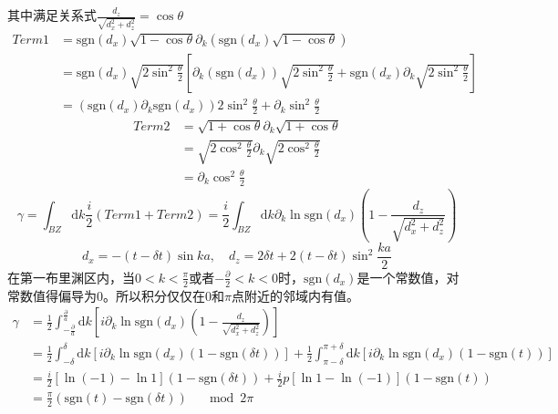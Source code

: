 \documentclass{article}
\numberwithin{equation}{subsection}
\newcommand{\md}{\mathrm{d}}
\newcommand{\sgn}{\mathrm{sgn}}
\begin{document}
其中满足关系式$\frac{d_z}{\sqrt{d_x^2+d_z^2}}=\cos\theta$
\begin{equation}
    \begin{split}
        Term1&=\sgn(d_x)\sqrt{1-\cos\theta}\partial_k(\sgn(d_x)\sqrt{1-\cos\theta})\\
        &=\sgn(d_x)\sqrt{2\sin^2\frac{\theta}{2}}\left[\partial_k(\sgn(d_x))\sqrt{2\sin^2\frac{\theta}{2}}+\sgn(d_x)\partial_k\sqrt{2\sin^2\frac{\theta}{2}}\right]\\
        &=(\sgn(d_x)\partial_k\sgn(d_x))2\sin^2\frac{\theta}{2}+\partial_k\sin^2\frac{\theta}{2}
    \end{split}
\end{equation}
\begin{equation}
    \begin{split}
        Term2&=\sqrt{1+\cos\theta}\partial_k\sqrt{1+\cos\theta}\\
        &=\sqrt{2\cos^2\frac{\theta}{2}}\partial_k\sqrt{2\cos^2\frac{\theta}{2}}\\
        &=\partial_k\cos^2\frac{\theta}{2}
    \end{split}
\end{equation}
\begin{equation}
    \gamma=\int_{BZ}\md k\frac{i}{2}(Term1+Term2)=\frac{i}{2}\int_{BZ}\md k\partial_k\ln\sgn(d_x)\left(1-\frac{d_z}{\sqrt{d_x^2+d_z^2}}\right)
\end{equation}
\begin{equation}
    d_x=-(t-\delta t)\sin ka,\quad d_z=2\delta t+2(t-\delta t)\sin^2\frac{ka}{2}
\end{equation}
在第一布里渊区内，当$0<k<\frac{\pi}{2}$或者$-\frac{\partial}{2}<k<0$时，$\sgn(d_x)$是一个常数值，对常数值得偏导为$0$。所以积分仅仅在$0$和$\pi$点附近的邻域内有值。
\begin{equation}
    \begin{split}
        \gamma&=\frac{1}{2}\int_{-\frac{\partial}{a}}^{\frac{\partial}{a}}\md k[i\partial_k\ln\sgn(d_x)(1-\frac{d_z}{\sqrt{d_x^2+d_z^2}})]\\
        &=\frac{1}{2}\int_{-\delta}^{\delta}\md k[i\partial_k\ln\sgn(d_x)(1-\sgn(\delta t))]+\frac{1}{2}\int_{\pi-\delta}^{\pi+\delta}\md k[i\partial_k\ln\sgn(d_x)(1-\sgn(t))]\\
        &=\frac{i}{2}[\ln(-1)-\ln1](1-\sgn(\delta t))+\frac{i}{2}p[\ln1-\ln(-1)](1-\sgn(t))\\
        &=\frac{\pi}{2}(\sgn(t)-\sgn(\delta t))\quad \mod{2\pi}
    \end{split}
\end{equation}
\end{document}
